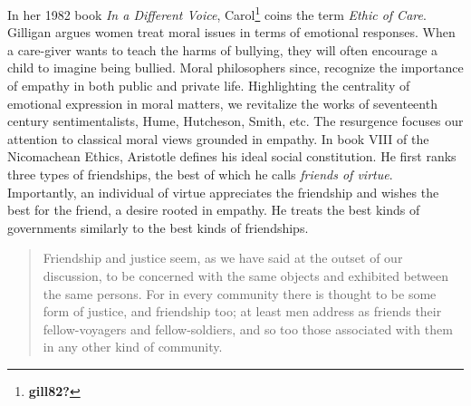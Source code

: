 \documentclass[phdthesis,12pt,final]{wuthesis}
\theoremstyle{definition}
\theoremstyle{definition}
\theoremstyle{definition}
\theoremstyle{definition}
\theoremstyle{remark}
\begin{document}
In her 1982 book \emph{In a Different Voice}, Carol\footnote{\textbf{gill82?}} coins the term \emph{Ethic of Care}. Gilligan argues women treat moral issues in terms of emotional responses. When a care-giver wants to teach the harms of bullying, they will often encourage a child to imagine being bullied. Moral philosophers since, recognize the importance of empathy in both public and private life. Highlighting the centrality of emotional expression in moral matters, we revitalize the works of seventeenth century sentimentalists, Hume, Hutcheson, Smith, etc. The resurgence focuses our attention to classical moral views grounded in empathy. In book VIII of the Nicomachean Ethics, Aristotle defines his ideal social constitution. He first ranks three types of friendships, the best of which he calls \emph{friends of virtue}. Importantly, an individual of virtue appreciates the friendship and wishes the best for the friend, a desire rooted in empathy. He treats the best kinds of governments similarly to the best kinds of friendships.

\begin{quote}
Friendship and justice seem, as we have said at the outset of our discussion, to be concerned with the same objects and exhibited between the same persons. For in every community there is thought to be some form of justice, and friendship too; at least men address as friends their fellow-voyagers and fellow-soldiers, and so too those associated with them in any other kind of community.
\end{quote}
\end{document}
